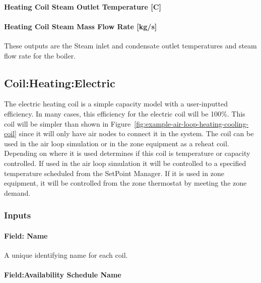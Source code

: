 \paragraph{Heating Coil Steam Outlet Temperature {[}C{]}}\label{heating-coil-steam-outlet-temperature-c}

\paragraph{Heating Coil Steam Mass Flow Rate {[}kg/s{]}}\label{heating-coil-steam-mass-flow-rate-kgs}

These outputs are the Steam inlet and condensate outlet temperatures and steam flow rate for the boiler.

\subsection{Coil:Heating:Electric}\label{coilheatingelectric}

The electric heating coil is a simple capacity model with a user-inputted efficiency. In many cases, this efficiency for the electric coil will be 100\%. This coil will be simpler than shown in Figure~\ref{fig:example-air-loop-heating-cooling-coil} since it will only have air nodes to connect it in the system. The coil can be used in the air loop simulation or in the zone equipment as a reheat coil. Depending on where it is used determines if this coil is temperature or capacity controlled. If used in the air loop simulation it will be controlled to a specified temperature scheduled from the SetPoint Manager. If it is used in zone equipment, it will be controlled from the zone thermostat by meeting the zone demand.

\subsubsection{Inputs}\label{inputs-3-017}

\paragraph{Field: Name}\label{field-name-3-015}

A unique identifying name for each coil.

\paragraph{Field:Availability Schedule Name}\label{fieldavailability-schedule-name-3}

